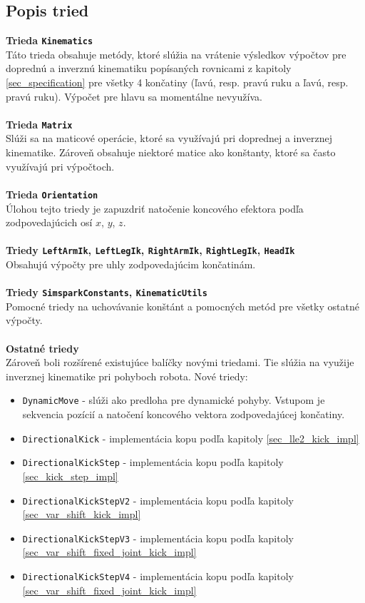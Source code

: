 \subsection{Popis tried} \label{sec_classes_desc}
\textbf{Trieda \texttt{Kinematics}}
\\
Táto trieda obsahuje metódy, ktoré slúžia na vrátenie výsledkov výpočtov pre doprednú a inverznú kinematiku popísaných rovnicami z kapitoly \ref{sec_specification} pre všetky 4 končatiny (ľavú, resp. pravú ruku a ľavú, resp. pravú ruku). Výpočet pre hlavu sa momentálne nevyužíva.
\\\\
\textbf{Trieda \texttt{Matrix}}
\\
Slúži sa na maticové operácie, ktoré sa využívajú pri doprednej a inverznej kinematike. Zároveň obsahuje niektoré matice ako konštanty, ktoré sa často využívajú pri výpočtoch. 
\\\\
\textbf{Trieda \texttt{Orientation}}
\\
Úlohou tejto triedy je zapuzdriť natočenie koncového efektora podľa zodpovedajúcich osí $x$, $y$, $z$.
\\\\
\textbf{Triedy \texttt{LeftArmIk}, \texttt{LeftLegIk}, \texttt{RightArmIk}, \texttt{RightLegIk}, \texttt{HeadIk}}
\\
Obsahujú výpočty pre uhly zodpovedajúcim končatinám.
\\\\
\textbf{Triedy \texttt{SimsparkConstants}, \texttt{KinematicUtils}}
\\
Pomocné triedy na uchovávanie konštánt a pomocných metód pre všetky ostatné výpočty.
\\\\
\textbf{Ostatné triedy}\\
Zároveň boli rozšírené existujúce balíčky novými triedami. Tie slúžia na využije inverznej kinematike pri pohyboch robota. Nové triedy:
\begin{itemize}
	\item \texttt{DynamicMove} - slúži ako predloha pre dynamické pohyby. Vstupom je sekvencia pozícií a natočení koncového vektora zodpovedajúcej končatiny.
	\item \texttt{DirectionalKick} - implementácia kopu podľa kapitoly \ref{sec_lle2_kick_impl}
	\item \texttt{DirectionalKickStep} -  implementácia kopu podľa kapitoly \ref{sec_kick_step_impl}
	\item \texttt{DirectionalKickStepV2} - implementácia kopu podľa kapitoly \ref{sec_var_shift_kick_impl}
	\item \texttt{DirectionalKickStepV3} - implementácia kopu podľa kapitoly \ref{sec_var_shift_fixed_joint_kick_impl}
	\item \texttt{DirectionalKickStepV4} - implementácia kopu podľa kapitoly \ref{sec_var_shift_fixed_joint_kick_impl}
\end{itemize}

